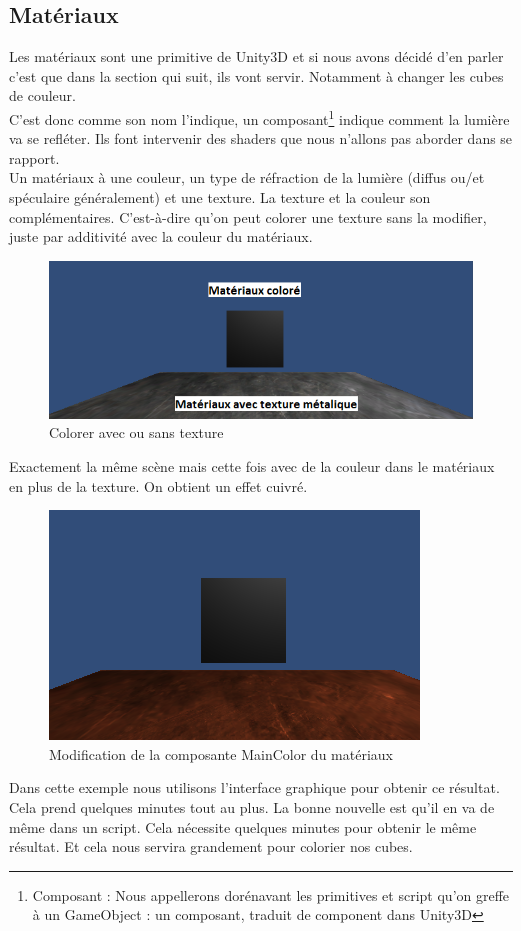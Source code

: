 \documentclass[a4paper,11pt]{myreport}
\begin{document}
	\subsection{Matériaux}
	\par Les matériaux sont une primitive de Unity3D et si nous avons décidé d'en parler c'est que dans la section qui suit, ils vont servir. Notamment à changer les cubes de couleur.\\
	C'est donc comme son nom l'indique, un composant\footnote{Composant : Nous appellerons dorénavant les primitives et script qu'on greffe à un GameObject : un composant, traduit de component dans Unity3D} indique comment la lumière va se refléter. Ils font intervenir des shaders que nous n'allons pas aborder dans se rapport.\\
	Un matériaux à une couleur, un type de réfraction de la lumière (diffus ou/et spéculaire généralement) et une texture. La texture et la couleur son complémentaires. C'est-à-dire qu'on peut colorer une texture sans la modifier, juste par additivité avec la couleur du matériaux.
	\begin{figure}[h]
	\includegraphics[scale=0.50]{./images/materiaux.png}
	\caption{Colorer avec ou sans texture}
	\end{figure}
	\par Exactement la même scène mais cette fois avec de la couleur dans le matériaux en plus de la texture. On obtient un effet cuivré.
	\begin{figure}[h]
	\includegraphics[scale=0.40]{./images/materiaux_cuivre.png}
	\caption{Modification de la composante MainColor du matériaux}
	\end{figure}
	\par Dans cette exemple nous utilisons l'interface graphique pour obtenir ce résultat. Cela prend quelques minutes tout au plus. La bonne nouvelle est qu'il en va de même dans un script. Cela nécessite quelques minutes pour obtenir le même résultat. Et cela nous servira grandement pour colorier nos cubes.
	\newpage
\end{document}
